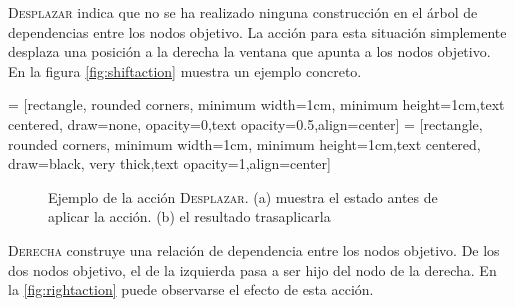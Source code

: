 \textsc{Desplazar} indica que no se ha realizado ninguna construcción en el
árbol de dependencias entre los nodos objetivo. La acción para esta situación
simplemente desplaza una posición a la derecha la ventana que apunta a los nodos
objetivo. En la figura \autoref{fig:shiftaction} muestra un ejemplo concreto.

 = [rectangle, rounded corners, minimum
  width=1cm, minimum height=1cm,text centered, draw=none,
  opacity=0,text opacity=0.5,align=center]
 = [rectangle, rounded corners, minimum width=1cm, minimum
  height=1cm,text centered, draw=black, very thick,text
  opacity=1,align=center]
\begin{figure}[ht]
  \centering
  \begin{subfigure}[b]{0.3\textwidth}
    \caption{}
  \end{subfigure}
  \qquad\qquad
  \begin{subfigure}[b]{0.3\textwidth}
    \caption{}
  \end{subfigure}
  \caption{Ejemplo de la acción \textsc{Desplazar}. (a) muestra el
    estado antes de aplicar la acción. (b) el resultado trasaplicarla}
  \label{fig:shiftaction}
\end{figure}
\textsc{Derecha} construye una relación de dependencia entre los nodos
objetivo. De los dos nodos objetivo, el de la izquierda pasa a ser hijo
del nodo de la derecha. En la \autoref{fig:rightaction} puede observarse el
efecto de esta acción.
